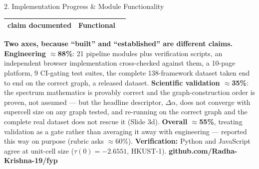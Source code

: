 \documentclass[aspectratio=169, 11pt]{beamer}
\begin{document}
\begin{frame}{2. Implementation Progress \& Module Functionality}
\begin{table}
\begin{tabular}{p{3.0cm} p{7.0cm} c}
claim documented & \textcolor{okGreen}{\textbf{Functional}} \\
\bottomrule
\end{tabular}
\end{table}
\vspace{-0.32cm}
{\tiny
\textbf{Two axes, because ``built'' and ``established'' are different claims.}
\textbf{Engineering $\approx$88\%}: 21 pipeline modules plus verification scripts, an
independent browser implementation cross-checked against them, a 10-page platform, 9
CI-gating test suites, the complete 138-framework dataset taken end to end on the correct
graph, a released dataset.
\textbf{Scientific validation $\approx$35\%}: the spectrum mathematics is provably correct
and the graph-construction order is proven, not assumed --- but the headline descriptor,
$\Delta\alpha$, does not converge with supercell size on any graph tested, and re-running on
the correct graph and the complete real dataset does not rescue it (Slide 3d).
\textbf{Overall $\approx$55\%}, treating validation as a gate rather than averaging it away
with engineering --- reported this way on purpose (rubric asks $\approx$60\%).
\textbf{Verification:} Python and JavaScript agree at unit-cell size ($\tau(0)=-2.6551$,
HKUST-1). \textbf{github.com/Radha-Krishna-19/fyp}}
\end{frame}
\end{document}
